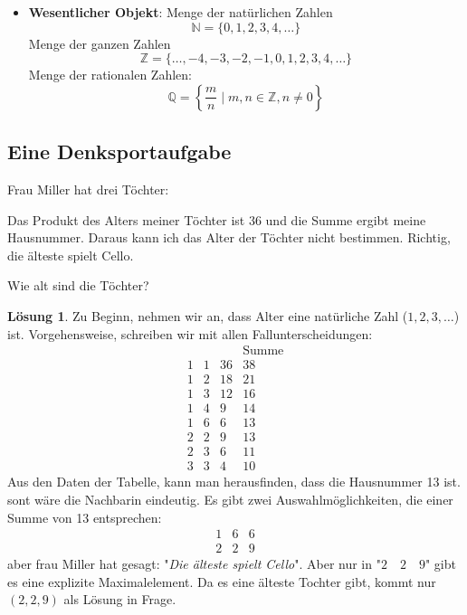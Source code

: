 \documentclass{article}
\theoremstyle{definition}
\newtheorem*{lo*}{Lösung}
\theoremstyle{plain}
\newtheorem{lem}[definition]{Lemma}
\begin{document}
\begin{itemize}
\begin{tcolorbox}[colback={white}, colframe={DarkGreen},breakable]
\begin{lem}
\begin{proof}
				\begin{align*}
					n^2 = (2m+1)^2 & = 4m^2 + 4m + 1 \\
					& = 2(\underbrace{2m^2 + 2m}_{= m' \in \mathbb{Z}}) + 1 \\
					& = 2m' + 1
				\end{align*}
			\end{proof}
		\end{lem}
	\end{tcolorbox}
	\item \textbf{Wesentlicher Objekt}: Menge der natürlichen Zahlen
	\[ 
	\mathbb{N} = \{ 0,1,2,3,4,\ldots \}
	 \]
	Menge der ganzen Zahlen
	\[ 
	\mathbb{Z} = \{ \ldots , -4 , -3 , -2 , -1 , 0 , 1 , 2 , 3 , 4, \ldots \}
	 \]
	Menge der rationalen Zahlen:
	\[ 
	\mathbb{Q} = \left\{ \frac{m}{n} \mid m,n \in \mathbb{Z}, n \neq 0 \right\}
	 \]
\end{itemize}
\begin{tcolorbox}[breakable]
\subsection*{Eine Denksportaufgabe}
Frau Miller hat drei Töchter: 
\begin{dialogue}
	 Das Produkt des Alters meiner Töchter ist 36 und die Summe ergibt meine Hausnummer.
	 Daraus kann ich das Alter der Töchter nicht bestimmen.
	 Richtig, die älteste spielt Cello.
\end{dialogue}
\noindent Wie alt sind die Töchter?
\begin{lo*}
	Zu Beginn, nehmen wir an, dass Alter eine natürliche Zahl ($ 1,2,3, \ldots  $) ist. Vorgehensweise, schreiben wir mit allen Fallunterscheidungen:
	\[ 
	\begin{array}{cccc}
		&&& \text{Summe} \\
		1 & 1 & 36 & 38 \\
		1 & 2 & 18 & 21 \\
		1 & 3 & 12 & 16 \\
		1 & 4 & 9  & 14 \\
		1 & 6 & 6  & 13 \\
		2 & 2 & 9  & 13 \\
		2 & 3 & 6  & 11 \\
		3 & 3 & 4  & 10
	\end{array}
	\]
	Aus den Daten der Tabelle, kann man herausfinden, dass die Hausnummer 13 ist. sont wäre die Nachbarin eindeutig. Es gibt zwei Auswahlmöglichkeiten, die einer Summe von 13 entsprechen:
	\[ 
	\begin{array}{ccc}
		1 & 6 & 6 \\
		2 & 2 & 9
	\end{array}
	\]
	aber frau Miller hat gesagt: "\textit{Die älteste spielt Cello}". Aber nur in "$ 2 \quad 2 \quad 9 $" gibt es eine explizite Maximalelement. Da es eine älteste Tochter gibt, kommt nur $ (2,2,9) $ als Lösung in Frage.
\end{lo*}
\end{tcolorbox}
\newpage
\end{document}
